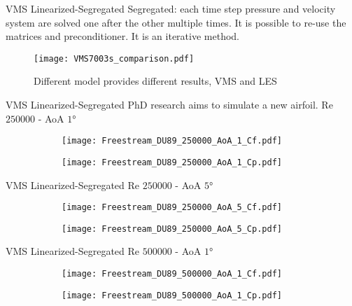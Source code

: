 \begin{frame}{VMS Linearized-Segregated}
Segregated: each time step pressure and velocity system are solved one after the other multiple times. It is possible to re-use the matrices and preconditioner. It is an iterative method.
\begin{figure}[h]
     \centering          
         \texttt{[image:  VMS7003s\_comparison.pdf]}
         \caption{Different model provides different results, VMS and LES}
     \end{figure} 
\end{frame}




\begin{frame}{VMS Linearized-Segregated}
PhD research aims to simulate a new airfoil.
Re $\num{250000}$ - AoA $\ang{1}$ 

\begin{figure}[h]
     \centering          
     \begin{subfigure}[h]{0.45\textwidth}
              \centering
         \texttt{[image: Freestream\_DU89\_250000\_AoA\_1\_Cf.pdf]}
    \end{subfigure}
          \hfill
     \begin{subfigure}[h]{0.45\textwidth}
      \centering
         \texttt{[image: Freestream\_DU89\_250000\_AoA\_1\_Cp.pdf]}
     \end{subfigure}
     \end{figure} 
 \end{frame}

\begin{frame}{VMS Linearized-Segregated}
Re $\num{250000}$ - AoA $\ang{5}$ 
\begin{figure}[h]
     \centering          
     \begin{subfigure}[h]{0.45\textwidth}
              \centering
         \texttt{[image: Freestream\_DU89\_250000\_AoA\_5\_Cf.pdf]}
    \end{subfigure}
          \hfill
     \begin{subfigure}[h]{0.45\textwidth}
      \centering
         \texttt{[image: Freestream\_DU89\_250000\_AoA\_5\_Cp.pdf]}
     \end{subfigure}
     \end{figure} 
 \end{frame}

\begin{frame}{VMS Linearized-Segregated}
Re $\num{500000}$ - AoA $\ang{1}$ 
\begin{figure}[h]
     \centering          
     \begin{subfigure}[h]{0.45\textwidth}
              \centering
         \texttt{[image: Freestream\_DU89\_500000\_AoA\_1\_Cf.pdf]}
    \end{subfigure}
          \hfill
     \begin{subfigure}[h]{0.45\textwidth}
      \centering
         \texttt{[image: Freestream\_DU89\_500000\_AoA\_1\_Cp.pdf]}
     \end{subfigure}
     \end{figure} 
 \end{frame}

